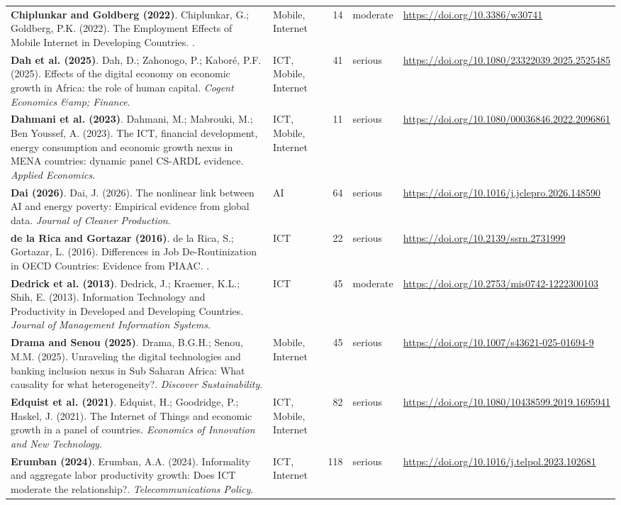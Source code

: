 {\begin{longtable}{@{}p{7.4cm} p{1.3cm} r l p{3.4cm}@{}}
\textbf{Chiplunkar and Goldberg (2022)}. Chiplunkar, G.; Goldberg, P.K. (2022). The Employment Effects of Mobile Internet in Developing Countries. \emph{}. & Mobile, Internet & 14 & moderate & \url{https://doi.org/10.3386/w30741} \\
\textbf{Dah et al. (2025)}. Dah, D.; Zahonogo, P.; Kaboré, P.F. (2025). Effects of the digital economy on economic growth in Africa: the role of human capital. \emph{Cogent Economics \&amp; Finance}. & ICT, Mobile, Internet & 41 & serious & \url{https://doi.org/10.1080/23322039.2025.2525485} \\
\textbf{Dahmani et al. (2023)}. Dahmani, M.; Mabrouki, M.; Ben Youssef, A. (2023). The ICT, financial development, energy consumption and economic growth nexus in MENA countries: dynamic panel CS-ARDL evidence. \emph{Applied Economics}. & ICT, Mobile, Internet & 11 & serious & \url{https://doi.org/10.1080/00036846.2022.2096861} \\
\textbf{Dai (2026)}. Dai, J. (2026). The nonlinear link between AI and energy poverty: Empirical evidence from global data. \emph{Journal of Cleaner Production}. & AI & 64 & serious & \url{https://doi.org/10.1016/j.jclepro.2026.148590} \\
\textbf{de la Rica and Gortazar (2016)}. de la Rica, S.; Gortazar, L. (2016). Differences in Job De-Routinization in OECD Countries: Evidence from PIAAC. \emph{}. & ICT & 22 & serious & \url{https://doi.org/10.2139/ssrn.2731999} \\
\textbf{Dedrick et al. (2013)}. Dedrick, J.; Kraemer, K.L.; Shih, E. (2013). Information Technology and Productivity in Developed and Developing Countries. \emph{Journal of Management Information Systems}. & ICT & 45 & moderate & \url{https://doi.org/10.2753/mis0742-1222300103} \\
\textbf{Drama and Senou (2025)}. Drama, B.G.H.; Senou, M.M. (2025). Unraveling the digital technologies and banking inclusion nexus in Sub Saharan Africa: What causality for what heterogeneity?. \emph{Discover Sustainability}. & Mobile, Internet & 45 & serious & \url{https://doi.org/10.1007/s43621-025-01694-9} \\
\textbf{Edquist et al. (2021)}. Edquist, H.; Goodridge, P.; Haskel, J. (2021). The Internet of Things and economic growth in a panel of countries. \emph{Economics of Innovation and New Technology}. & ICT, Mobile, Internet & 82 & serious & \url{https://doi.org/10.1080/10438599.2019.1695941} \\
\textbf{Erumban (2024)}. Erumban, A.A. (2024). Informality and aggregate labor productivity growth: Does ICT moderate the relationship?. \emph{Telecommunications Policy}. & ICT, Internet & 118 & serious & \url{https://doi.org/10.1016/j.telpol.2023.102681} \\

\end{longtable}}
